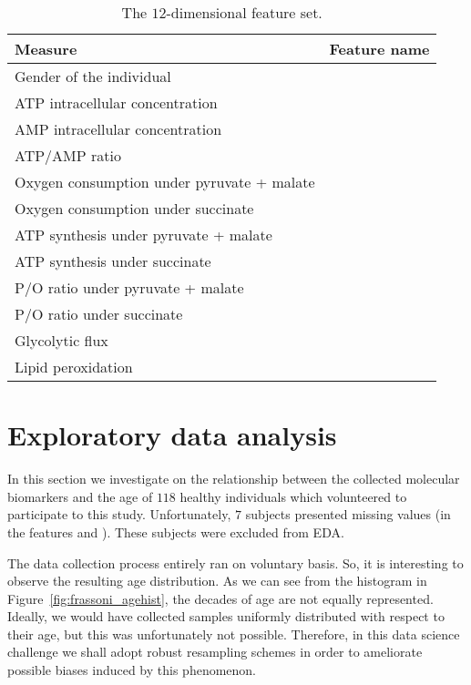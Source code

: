 \begin{table}[]
	\centering
	\caption{The $12$-dimensional feature set.}
	\label{tab:aging_features}
	\begin{tabular}{@{}ll@{}}
		\toprule
		\textbf{Measure}                                    & \textbf{Feature name}\\ \midrule
		Gender of the individual                      & \gender          \\
		ATP intracellular concentration            & \atp         \\
		AMP intracellular concentration            & \amp         \\
		ATP/AMP ratio                              & \atpamp      \\
		Oxygen consumption under pyruvate + malate & \copyrmal    \\
		Oxygen consumption under succinate         & \cosucc      \\
		ATP synthesis under pyruvate + malate      & \atppyrmal   \\
		ATP synthesis under succinate              & \atpsucc     \\
		P/O ratio under pyruvate + malate          & \popyrmal    \\
		P/O ratio under succinate                  & \posucc      \\
		Glycolytic flux                            & \ldh         \\
		Lipid peroxidation                         & \mda         \\ \bottomrule
	\end{tabular}
\end{table}


\section{Exploratory data analysis} \label{sec:frassoni_EDA}
In this section we investigate on the relationship between the collected molecular biomarkers and the age of $118$ healthy individuals which volunteered to participate to this study.
Unfortunately, $7$ subjects presented missing values (in the features \ldh and \gender). These subjects were excluded from EDA.


The data collection process entirely ran on voluntary basis. So, it is interesting to observe the resulting age distribution. As we can see from the histogram in Figure~\ref{fig:frassoni_agehist}, the decades of age are not equally represented. Ideally, we would have collected samples uniformly distributed with respect to their age, but this was unfortunately not possible. Therefore, in this data science challenge we shall adopt robust resampling schemes in order to ameliorate possible biases induced by this phenomenon.

